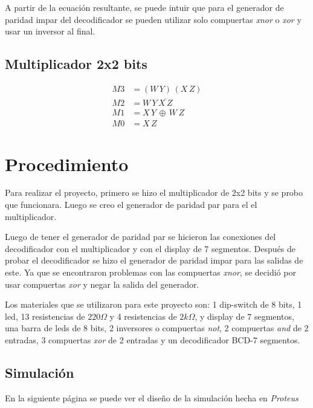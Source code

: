 \documentclass[12pt, oneside, openany]{article}
\begin{document}
{\sffamily\Large
    \hspace{0.5cm} A partir de la ecuación resultante, se puede intuir que para el generador de paridad impar del decodificador se pueden utilizar solo compuertas \emph{xnor} o \emph{xor} y usar un inversor al final.
    
}

\newpage
\subsection{Multiplicador 2x2 bits}
{\sffamily\large
    \begin{equation*}
        \begin{split}
            M3 & = (W\,Y)\,(X\,Z) \\
            M2 & = W\,Y\,\overline{X\,Z} \\
            M1 & = X\,Y\,\oplus\,W\,Z \\
            M0 & = X\,Z
        \end{split}
    \end{equation*}
}

\section{Procedimiento}
{\sffamily\Large
    \hspace{0.5cm} Para realizar el proyecto, primero se hizo el multiplicador de 2x2 bits y se probo que funcionara. Luego se creo el generador de paridad par para el el multiplicador.
    
    \hspace{0.5cm} Luego de tener el generador de paridad par se hicieron las conexiones del decodificador con el multiplicador y con el display de 7 segmentos. Después de probar el decodificador se hizo el generador de paridad impar para las salidas de este. Ya que se encontraron problemas con las compuertas \emph{xnor}, se decidió por usar compuertas \emph{xor} y negar la salida del generador.
    
    \hspace{0.5cm} Los materiales que se utilizaron para este proyecto son: 1 dip-switch de 8 bits, 1 led, 13 resistencias de $220\Omega$ y 4 resistencias de $2k\Omega$, y display de 7 segmentos, una barra de leds de 8 bits, 2 inversores o compuertas \emph{not}, 2 compuertas \emph{and} de 2 entradas, 3 compuertas \emph{xor} de 2 entradas y un decodificador BCD-7 segmentos.
}

\subsection{Simulación}
{\sffamily\Large
    \hspace{0.5cm} En la siguiente página se puede ver el diseño de la simulación hecha en \emph{Proteus\texttrademark}
    
}
\end{document}
